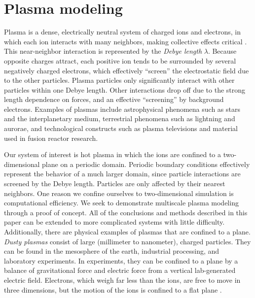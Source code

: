 \documentclass{article}
\begin{document}
\section{Plasma modeling}

Plasma is a dense, electrically neutral system of charged ions and electrons, in which each ion interacts with many neighbors, making collective effects critical \cite{sturrock1994plasma}. This near-neighbor interaction is represented by the \emph{Debye length} $\lambda$. Because opposite charges attract, each positive ion tends to be surrounded by several negatively charged electrons, which effectively ``screen'' the electrostatic field due to the other particles. Plasma particles only significantly interact with other particles within one Debye length. Other interactions drop off due to the strong length dependence on forces, and an effective ``screening'' by background electrons. Examples of plasmas include astrophysical phenomena such as stars and the interplanetary medium, terrestrial phenomena such as lightning and aurorae, and technological constructs such as plasma televisions and material used in fusion reactor research.

Our system of interest is hot plasma in which the ions are confined to a two-dimensional plane on a periodic domain. Periodic boundary conditions effectively represent the behavior of a much larger domain, since particle interactions are screened by the Debye length. Particles are only affected by their nearest neighbors. One reason we confine ourselves to two-dimensional simulation is computational efficiency. We seek to demonstrate multiscale plasma modeling through a proof of concept. All of the conclusions and methods described in this paper can be extended to more complicated systems with little difficulty. Additionally, there are physical examples of plasmas that are confined to a plane. \emph{Dusty plasmas} consist of large (millimeter to nanometer), charged particles. They can be found in the mesosphere of the earth, industrial processing, and laboratory experiments. In experiments, they can be confined to a plane by a balance of gravitational force and electric force from a vertical lab-generated electric field. Electrons, which weigh far less than the ions, are free to move in three dimensions, but the motion of the ions is confined to a flat plane \cite{shukla2001introduction}.
\end{document}
